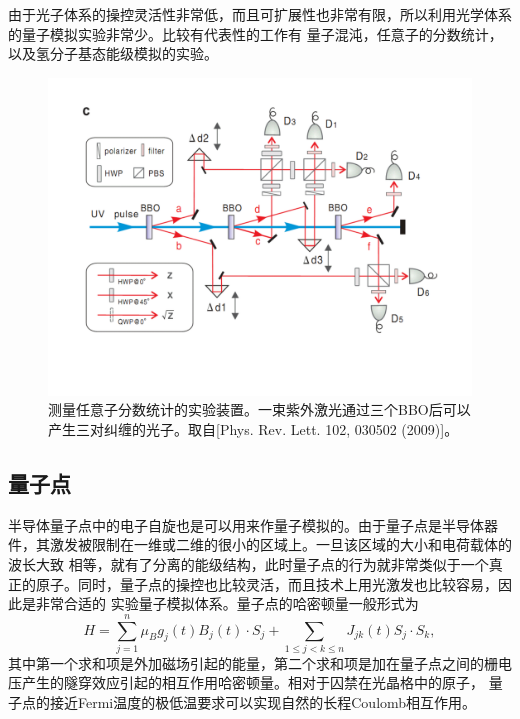 由于光子体系的操控灵活性非常低，而且可扩展性也非常有限，所以利用光学体系的量子模拟实验非常少。比较有代表性的工作有
量子混沌\cite{chaos1}，任意子的分数统计\cite{anyons1}，以及氢分子基态能级模拟的实验\cite{optics_static}。
\begin{figure}[htbp]
            \begin{center}
              \includegraphics[width= 0.8\columnwidth]{figures/photons.pdf}
              \caption{测量任意子分数统计的实验装置。一束紫外激光通过三个BBO后可以产生三对纠缠的光子。取自[Phys. Rev. Lett. 102, 030502 (2009)\cite{anyons1}]。}
              \label{photons}
            \end{center}
        \end{figure}

\subsection{量子点}

半导体量子点中的电子自旋\cite{dotsim1}也是可以用来作量子模拟的。由于量子点是半导体器件，其激发被限制在一维或二维的很小的区域上。一旦该区域的大小和电荷载体的波长大致
相等，就有了分离的能级结构，此时量子点的行为就非常类似于一个真正的原子。同时，量子点的操控也比较灵活，而且技术上用光激发也比较容易，因此是非常合适的
实验量子模拟体系。量子点的哈密顿量一般形式为
 \begin{equation}\label{dotsim}
 H = \sum_{j=1}^n\mu_B g_j(t) B_j(t)\cdot S_j +\sum_{1\leq j<k\leq n} J_{jk}(t)S_j\cdot S_k,
\end{equation}
其中第一个求和项是外加磁场引起的能量，第二个求和项是加在量子点之间的栅电压产生的隧穿效应引起的相互作用哈密顿量。相对于囚禁在光晶格中的原子，
量子点的接近Fermi温度的极低温要求可以实现自然的长程Coulomb相互作用\cite{dotsim2}。

